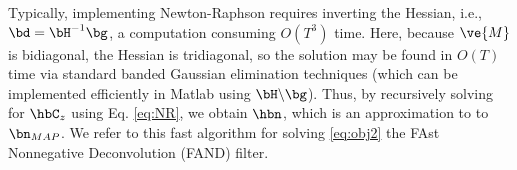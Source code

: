 Typically, implementing Newton-Raphson requires inverting the Hessian, i.e., $\bd = \bH^{-1} \bg$, a computation consuming $O(T^3)$ time. Here, because $\ve{M}$ is bidiagonal, the Hessian is tridiagonal, so the solution may be found in $O(T)$ time via standard banded Gaussian elimination techniques (which can be implemented efficiently in Matlab using $\bH \backslash \bg$). Thus, by recursively solving for $\hbC_z$ using Eq. \eqref{eq:NR}, we obtain $\hbn$, which is an approximation to to $\bn_{MAP}$.  We refer to this fast algorithm for solving \eqref{eq:obj2} the FAst Nonnegative Deconvolution (FAND) filter.  